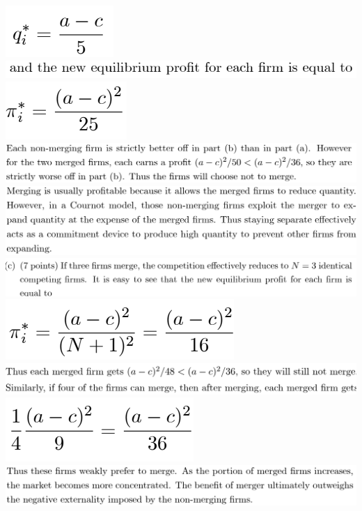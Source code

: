 \documentclass[8pt,landscape]{extarticle}
\begin{document}
\begin{multicols*}{3}
    \includegraphics[width=0.1\linewidth,keepaspectratio]{Screenshots/Screenshot 2024-03-11 134554.png}
    \includegraphics[width=0.47\linewidth,keepaspectratio]{Screenshots/Screenshot 2024-03-11 134557.png}
    \includegraphics[width=0.12\linewidth,keepaspectratio]{Screenshots/Screenshot 2024-03-11 134603.png}
    \includegraphics[width=0.71\linewidth,keepaspectratio]{Screenshots/Screenshot 2024-03-11 134612.png}
    \includegraphics[width=0.7\linewidth,keepaspectratio]{Screenshots/Screenshot 2024-03-11 134630.png}
    \includegraphics[width=0.74\linewidth,keepaspectratio]{Screenshots/Screenshot 2024-03-11 134641.png}
    \includegraphics[width=0.22\linewidth,keepaspectratio]{Screenshots/Screenshot 2024-03-11 134647.png}
    \includegraphics[width=0.69\linewidth,keepaspectratio]{Screenshots/Screenshot 2024-03-11 134656.png}
    \includegraphics[width=0.18\linewidth,keepaspectratio]{Screenshots/Screenshot 2024-03-11 134659.png}
    \includegraphics[width=0.7\linewidth,keepaspectratio]{Screenshots/Screenshot 2024-03-11 134708.png}

\end{multicols*}
\end{document}
